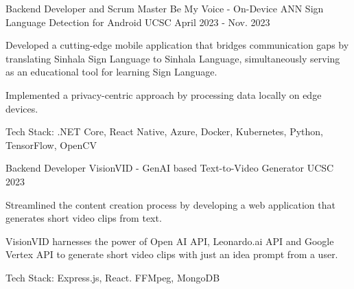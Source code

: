 \begin{cventries}
    
    \cventry
    {Backend Developer and Scrum Master} %
    {Be My Voice - On-Device ANN Sign Language Detection for Android \href{https://github.com/kulasinghet/backend-be-voice}{\faGithubSquare}} %
    {UCSC} %
    {April 2023 - Nov. 2023} %
    {
        \begin{cvitems} %
            \item {Developed a cutting-edge mobile application that bridges communication gaps by translating Sinhala Sign Language to Sinhala Language, simultaneously serving as an educational tool for learning Sign Language.}
            \item {Implemented a privacy-centric approach by processing data locally on edge devices.}
            \item {Tech Stack: .NET Core, React Native, Azure, Docker, Kubernetes, Python, TensorFlow, OpenCV}
        \end{cvitems}
    }



    \cventry
    {Backend Developer} %
    {VisionVID - GenAI based Text-to-Video Generator \href{https://visionvid.vercel.app/}{\faGithubSquare}} %
    {UCSC} %
    {2023} %
    {
        \begin{cvitems} %
            \item {Streamlined the content creation process by developing a web application that generates short video clips from text.}
            \item {VisionVID harnesses the power of Open AI API, Leonardo.ai API and Google Vertex API to generate short video clips with just an idea prompt from a user.}
            \item {Tech Stack: Express.js, React. FFMpeg, MongoDB}
        \end{cvitems}
    }

   




\end{cventries}
